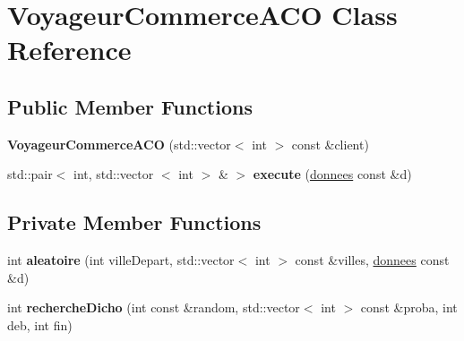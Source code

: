 \hypertarget{classVoyageurCommerceACO}{\section{\-Voyageur\-Commerce\-A\-C\-O \-Class \-Reference}
\label{classVoyageurCommerceACO}
}
\subsection*{\-Public \-Member \-Functions}
\begin{DoxyCompactItemize}
\item 
\hypertarget{classVoyageurCommerceACO_a4b22f5217ade02ff28c0ba500b332d01}{{\bfseries \-Voyageur\-Commerce\-A\-C\-O} (std\-::vector$<$ int $>$ const \&client)}\label{classVoyageurCommerceACO_a4b22f5217ade02ff28c0ba500b332d01}

\item 
\hypertarget{classVoyageurCommerceACO_aedcb443d8c3c9758ac0df983f8c39c1e}{std\-::pair$<$ int, std\-::vector\*
$<$ int $>$ \& $>$ {\bfseries execute} (\hyperlink{structdonnees}{donnees} const \&d)}\label{classVoyageurCommerceACO_aedcb443d8c3c9758ac0df983f8c39c1e}

\end{DoxyCompactItemize}
\subsection*{\-Private \-Member \-Functions}
\begin{DoxyCompactItemize}
\item 
\hypertarget{classVoyageurCommerceACO_ae593bd5970ae2632fccf88e3bdd3827c}{int {\bfseries aleatoire} (int ville\-Depart, std\-::vector$<$ int $>$ const \&villes, \hyperlink{structdonnees}{donnees} const \&d)}\label{classVoyageurCommerceACO_ae593bd5970ae2632fccf88e3bdd3827c}

\item 
\hypertarget{classVoyageurCommerceACO_a97adf68c3047d6d3d0b2e8d3c0532fa0}{int {\bfseries recherche\-Dicho} (int const \&random, std\-::vector$<$ int $>$ const \&proba, int deb, int fin)}\label{classVoyageurCommerceACO_a97adf68c3047d6d3d0b2e8d3c0532fa0}

\end{DoxyCompactItemize}
